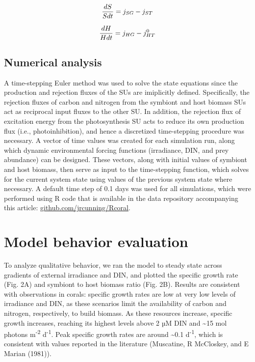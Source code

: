 \documentclass[]{elsarticle} %
\begin{document}
\begin{equation} {dS \over Sdt} = j_{SG} - j_{ST} \end{equation}

\begin{equation} {dH \over Hdt} = j_{HG} - j_{HT}^0 \end{equation}

\subsection{Numerical analysis}\label{numerical-analysis}

A time-stepping Euler method was used to solve the state equations since
the production and rejection fluxes of the SUs are imiplicitly defined.
Specifically, the rejection fluxes of carbon and nitrogen from the
symbiont and host biomass SUs act as reciprocal input fluxes to the
other SU. In addition, the rejection flux of excitation energy from the
photosynthesis SU acts to reduce its own production flux (i.e.,
photoinhibition), and hence a discretized time-stepping procedure was
necessary. A vector of time values was created for each simulation run,
along which dynamic environmental forcing functions (irradiance, DIN,
and prey abundance) can be designed. These vectors, along with initial
values of symbiont and host biomass, then serve as input to the
time-stepping function, which solves for the current system state using
values of the previous system state where necessary. A default time step
of 0.1 days was used for all simulations, which were performed using R
code that is available in the data repository accompanying this article:
\url{github.com/jrcunning/Rcoral}.

\section{Model behavior evaluation}\label{model-behavior-evaluation}

To analyze qualitative behavior, we ran the model to steady state across
gradients of external irradiance and DIN, and plotted the specific
growth rate (Fig. 2A) and symbiont to host biomass ratio (Fig. 2B).
Results are consistent with observations in corals: specific growth
rates are low at very low levels of irradiance and DIN, as these
scenarios limit the availability of carbon and nitrogen, respectively,
to build biomass. As these resources increase, specific growth
increases, reaching its highest levels above 2 µM DIN and
\textasciitilde{}15 mol photons m\textsuperscript{-2}
d\textsuperscript{-1}. Peak specific growth rates are around
\textasciitilde{}0.1 d\textsuperscript{-1}, which is consistent with
values reported in the literature (Muscatine, R McCloskey, and E Marian
(1981)).
\end{document}
